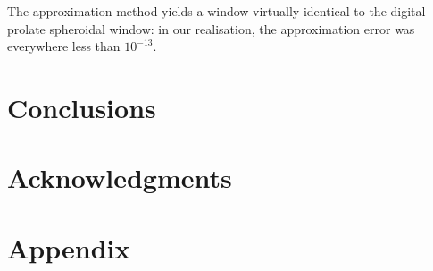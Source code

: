 \documentclass[twoside,a4paper]{article}
\begin{document}
The approximation method yields a window virtually identical to the digital
prolate spheroidal window: in our realisation, the approximation error was
everywhere less than $10^{-13}$.


\section{Conclusions}

\section{Acknowledgments}

\nocite{*}


\section{Appendix}
\end{document}
